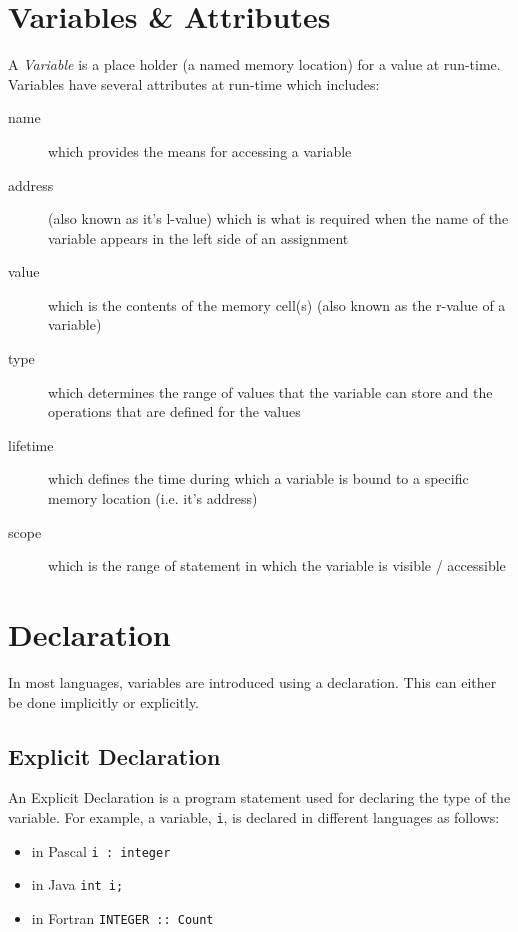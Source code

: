 
\section{Variables \& Attributes}
A \textit{Variable} is a place holder (a named memory location) for a value at run-time. Variables have several attributes at run-time which includes:
\begin{description}
    \item[name] which provides the means for accessing a variable
    \item[address] (also known as it's l-value) which is what is required when the name of the variable appears in the left side of an assignment 
    \item[value] which is the contents of the memory cell(s) (also known as the r-value of a variable)
    \item[type] which determines the range of values that the variable can store and the operations that are defined for the values
    \item[lifetime] which defines the time during which a variable is bound to a specific memory location (i.e. it's address) 
    \item[scope] which is the range of statement in which the variable is visible / accessible 
\end{description}

\section{Declaration}
In most languages, variables are introduced using a declaration. This can either be done implicitly or explicitly.
\subsection{Explicit Declaration}
An Explicit Declaration is a program statement used for declaring the type of the variable. For example, a variable, \verb|i|, is declared in different languages as follows:
\begin{itemize}
    \item in Pascal \verb|i : integer|
    \item in Java \verb|int i;|
    \item in Fortran \verb|INTEGER :: Count|
\end{itemize}
